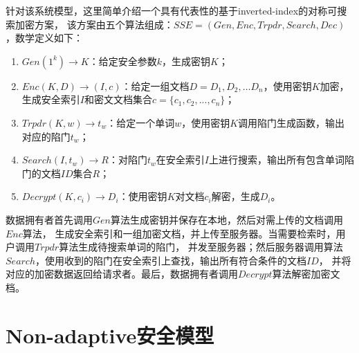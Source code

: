 针对该系统模型，这里简单介绍一个具有代表性的基于inverted-index的对称可搜索加密方案，
该方案由五个算法组成：$SSE = (Gen, Enc, Trpdr, Search, Dec)$，数学定义如下：
\begin{enumerate}
  \item
  $Gen(1^k ) \rightarrow K$：给定安全参数$k$，生成密钥$K$；

  \item
  $Enc(K,D) \rightarrow (I,c)$：给定一组文档$D={D_1,D_2  ,…D_n  }$，使用密钥$K$加密，
  生成安全索引$I$和密文文档集合$c =\{c_1, c_2, ..., c_n \}$；


  \item
  $Trpdr(K,w) \rightarrow t_w$：给定一个单词$w$，使用密钥$K$调用陷门生成函数，输出对应的陷门$t_w$；

  \item
  $Search(I,t_w) \rightarrow R$：对陷门$t_w$在安全索引$I$上进行搜索，输出所有包含单词陷门的文档$ID$集合$R$；

  \item
  $Decrypt(K, c_i) \rightarrow D_i$：使用密钥$K$对文档$c_i$解密，生成$D_i$。

\end{enumerate}
数据拥有者首先调用$Gen$算法生成密钥并保存在本地，然后对需上传的文档调用$Enc$算法，
生成安全索引和一组加密文档，并上传至服务器。当需要检索时，用户调用$Trpdr$算法生成待搜索单词的陷门，
并发至服务器；然后服务器调用算法$Search$，使用收到的陷门在安全索引上查找，输出所有符合条件的文档$ID$，
并将对应的加密数据返回给请求者。最后，数据拥有者调用$Decrypt$算法解密加密文档。



\section{Non-adaptive安全模型}
\label{sec:search_symm_security_model}



